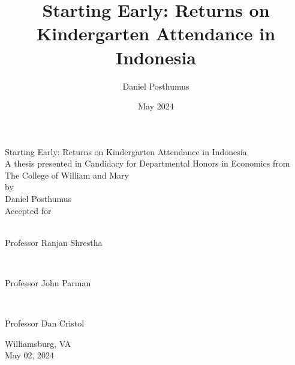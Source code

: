 \documentclass[11pt,final]{article}
\title{Starting Early: Returns on Kindergarten Attendance in Indonesia}
\author{Daniel Posthumus}
\date{May 2024}
\begin{document}
\begin{center}
{\Large Starting Early: Returns on Kindergarten Attendance in Indonesia} \\
\vspace{0.4in}
A thesis presented in Candidacy for Departmental Honors in Economics from The College of William and Mary \\
\vspace{0.2in}
by \\
\vspace{0.1in} 
Daniel Posthumus \\
\vspace{1in}
Accepted for \hrulefill \\
\vspace{0.3in}
\qquad \qquad \qquad \hrulefill \\
\vspace{-0.1in}
\end{center}
\qquad \qquad \qquad Professor Ranjan Shrestha \\
\begin{center}
\vspace{-0.25in}
\qquad \qquad \qquad \hrulefill \\
\vspace{-0.1in}
\end{center}
\qquad \qquad \qquad Professor John Parman \\
\begin{center}
\vspace{-0.25in}
\qquad \qquad \qquad \hrulefill \\
\vspace{-0.1in}
\end{center}
\qquad \qquad \qquad Professor Dan Cristol \\
\begin{center}
Williamsburg, VA \\
May 02, 2024
\end{center}
\thispagestyle{empty}
\clearpage
\restoregeometry

\maketitle
\thispagestyle{empty}
\end{document}

